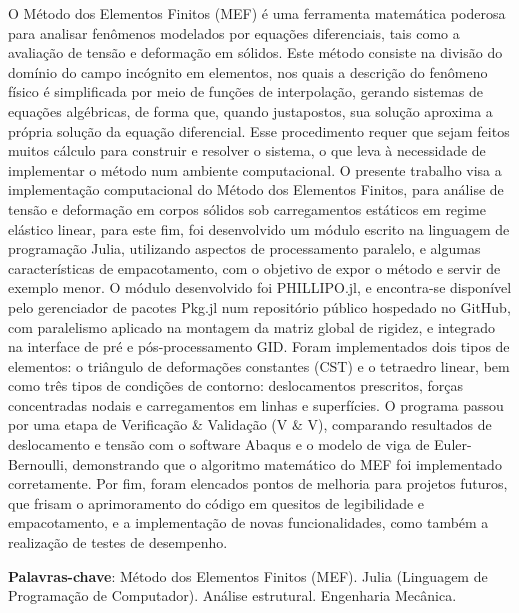 
\setlength{\absparsep}{18pt} %
\begin{resumo}
    O Método dos Elementos Finitos (MEF) é uma ferramenta matemática poderosa para analisar fenômenos modelados por equações diferenciais, tais como a avaliação de tensão e deformação em sólidos. Este método consiste na divisão do domínio do campo incógnito em elementos, nos quais a descrição do fenômeno físico é simplificada por meio de funções de interpolação, gerando sistemas de equações algébricas, de forma que, quando justapostos, sua solução aproxima a própria solução da equação diferencial. Esse procedimento requer que sejam feitos muitos cálculo para construir e resolver o sistema, o que leva à necessidade de implementar o método num ambiente computacional. O presente trabalho visa a implementação computacional do Método dos Elementos Finitos, para análise de tensão e deformação em corpos sólidos sob carregamentos estáticos em regime elástico linear, para este fim, foi desenvolvido um módulo escrito na linguagem de programação Julia, utilizando aspectos de processamento paralelo, e algumas características de empacotamento, com o objetivo de expor o método e servir de exemplo menor. O módulo desenvolvido foi PHILLIPO.jl, e encontra-se disponível pelo gerenciador de pacotes Pkg.jl num repositório público hospedado no GitHub, com paralelismo aplicado na montagem da matriz global de rigidez, e integrado na interface de pré e pós-processamento GID. Foram implementados dois tipos de elementos: o triângulo de deformações constantes (CST) e o tetraedro linear, bem como três tipos de condições de contorno: deslocamentos prescritos, forças concentradas nodais e carregamentos em linhas e superfícies. O programa passou por uma etapa de Verificação \& Validação (V \& V), comparando resultados de deslocamento e tensão com o software Abaqus e o modelo de viga de Euler-Bernoulli, demonstrando que o algoritmo matemático do MEF foi implementado corretamente. Por fim, foram elencados pontos de melhoria para projetos futuros, que frisam o aprimoramento do código em quesitos de legibilidade e empacotamento, e a implementação de novas funcionalidades, como também a realização de testes de desempenho.


    \textbf{Palavras-chave}: Método dos Elementos Finitos (MEF). Julia (Linguagem de Programação de Computador). Análise estrutural. Engenharia Mecânica.

\end{resumo}
